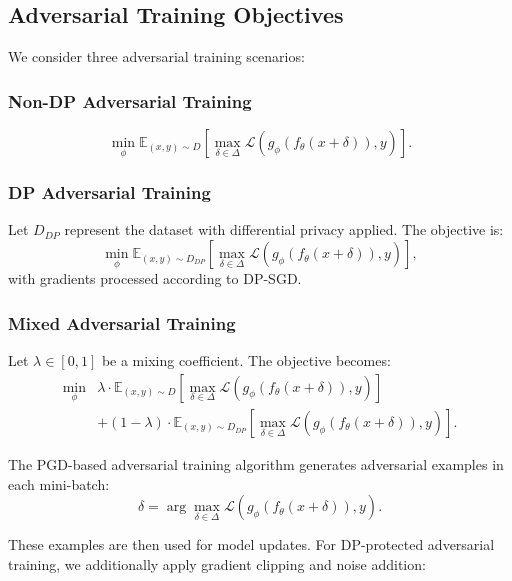 \documentclass[11pt, conference]{IEEEtran}
\begin{document}
\subsection{Adversarial Training Objectives}
We consider three adversarial training scenarios:

\subsubsection{Non-DP Adversarial Training}
\begin{equation}
\label{NonDPAT}
\min_{\phi} \mathbb{E}_{(x,y) \sim D} \left[ \max_{\delta \in \Delta} \mathcal{L}(g_{\phi}(f_{\theta}(x + \delta)), y) \right].
\end{equation}

\subsubsection{DP Adversarial Training}
Let $D_{DP}$ represent the dataset with differential privacy applied. The objective is:
\begin{equation}
\label{DPAT}
\min_{\phi} \mathbb{E}_{(x,y) \sim D_{DP}} \left[ \max_{\delta \in \Delta} \mathcal{L}(g_{\phi}(f_{\theta}(x + \delta)), y) \right],
\end{equation}
with gradients processed according to DP-SGD.

\subsubsection{Mixed Adversarial Training}
Let $\lambda \in [0,1]$ be a mixing coefficient. The objective becomes:
\begin{align}
\label{MixAT}
\min_{\phi} & \lambda \cdot \mathbb{E}_{(x,y) \sim D} \left[ \max_{\delta \in \Delta} \mathcal{L}(g_{\phi}(f_{\theta}(x + \delta)), y) \right] \nonumber \\
&+ (1-\lambda) \cdot \mathbb{E}_{(x,y) \sim D_{DP}} \left[ \max_{\delta \in \Delta} \mathcal{L}(g_{\phi}(f_{\theta}(x + \delta)), y) \right].
\end{align}


The PGD-based adversarial training algorithm generates adversarial examples in each mini-batch:
\begin{equation}
\delta = \arg\max_{\delta \in \Delta} \mathcal{L}(g_{\phi}(f_{\theta}(x + \delta)), y).
\end{equation}

These examples are then used for model updates. For DP-protected adversarial training, we additionally apply gradient clipping and noise addition:
\end{document}
